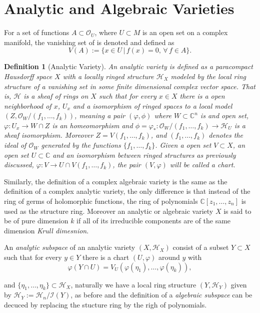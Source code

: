 \documentclass[12pt,twoside,a4paper]{report}
\newtheorem{definition}{Definition}[section]
\newcommand{\co}{\ensuremath{\mathbb C }}
\newcommand{\con}{\ensuremath{\mathbb{C}^n}}
\newcommand{\osheaf}{\ensuremath{\mathcal O }}
\begin{document}
\section{Analytic and Algebraic Varieties}
For a set of functions $A\subset\osheaf_{U}$, where $U\subset M$ is an open set on a complex manifold, the vanishing set of is denoted and defined as
\[
  V(A):=\{x\in U\,\vert\,f(x)=0,\,\forall\,f\in A\}.
\]
\begin{definition}[Analytic Variety]
An \emph{analytic variety} is defined as a paracompact Hausdorff space $X$ with a locally ringed structure $\mathcal{H}_{X}$ modeled by the local ring structure of a vanishing set in some finite dimensional complex vector space. That is, $\mathcal{H}$ is a sheaf of rings on $X$ such that for every $x\in X$ there is a open neighborhood of $x$, $U_{x}$ and a isomorphism of ringed spaces to a local model $(Z,\osheaf_{W}/(f_{1},\dots,f_{k}))$, meaning a pair $(\varphi,\phi)$ where $W\subset\con$ is and open set, $\varphi:U_{x}\rightarrow W\cap Z$ is an homeomorphism and $\phi=\varphi_{*}:\mathcal{O}_{W}/(f_{1},\dots,f_{k})\rightarrow\mathcal{H}_{U}$ is a sheaf isomorphism. Moreover $Z=V(f_{1},\dots,f_{k})$, and $(f_{1},\dots,f_{k})$ denotes the ideal of $\mathcal{O}_{W}$ generated by the functions $\{f_{1},\dots,f_{k}\}$. Given a open set $V\subset X$, an open set $U\subset\co$ and an isomorphism between ringed structures as previously discussed, $\varphi:V\rightarrow U\cap V(f_{1},\dots,f_{k})$, the pair $(V,\varphi)$ will be called a \emph{chart}.
\end{definition}
Similarly, the definition of a complex algebraic variety is the same as the definition of a complex analytic variety, the only difference is that instead of the ring of germs of holomorphic functions, the ring of polynomials $\co[z_{1},\dots,z_{n}]$ is used as the structure ring. Moreover an analytic or algebraic variety $X$ is said to be of pure dimension $k$ if all of its irreducible components are of the same dimension \emph{Krull dimesnion}.

An \emph{analytic subspace} of an analytic variety $(X,\mathcal{H}_{X})$ consist of a subset $Y\subset X$ such that for every $y\in Y$ there is a chart $(U,\varphi)$ around $y$ with
\[
  \varphi(Y\cap U)=V_U(\varphi(\eta_1),\dots,\varphi(\eta_k)),
\]

\noindent and $\lbrace\eta_1,\dots,\eta_k\rbrace\subset\mathcal{H}_{X}$, naturally we have a local ring structure $(Y,\mathcal{H}_{Y})$ given by $\mathcal{H}_Y:=\mathcal{H}_n/\mathcal{I}(Y)$, as before and the definition of a \emph{algebraic subspace} can be decuced by replacing the stucture ring by the righ of polynomials.
\end{document}
